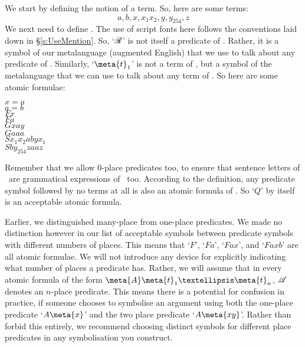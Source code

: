 We start by defining the notion of a term.
So, here are some terms:
	$$a, b, x, x_{1} x_{2}, y, y_{254}, z$$
We next need to define .
The use of script fonts here follows the conventions laid down in §\ref{s:UseMention}. So, `$\mathscr{R}$' is not itself a predicate of \FOL. Rather, it is a symbol of our metalanguage (augmented English) that we use to talk about any predicate of \FOL. Similarly, `$\meta{t}_{1}$' is not a term of \FOL, but a symbol of the metalanguage that we can use to talk about any term of \FOL. So here are some atomic formulae:
	\begin{center}
		$x = a$\\
		$a = b$\\
		$Fx$\\
		$Fa$\\
		$Gxay$\\
		$Gaaa$\\
		$Sx_{1} x_{2} a b y x_{1}$\\
		$Sby_{254} z a a z$\\
	\end{center}
Remember that we allow $0$-place predicates too, to ensure that sentence letters of \TFL\ are grammatical expressions of \FOL\ too. According to the definition, any predicate symbol followed by no terms at all is also an atomic formula of \FOL. So `$Q$' by itself is an acceptable atomic formula.

Earlier, we distinguished many-place from one-place predicates. We made no distinction however in our list of acceptable symbols between predicate symbols with different numbers of places. This means that `$F$', `$Fa$', `$Fax$', and `$Faxb$' are all atomic formulae. We will not introduce any device for explicitly indicating what number of places a predicate has. Rather, we will assume that in every atomic formula of the form $\meta{A}\meta{t}_{1}…\meta{t}_{n}$, $\mathscr{A}$ denotes an $n$-place predicate. This means there is a potential for confusion in practice, if someone chooses to symbolise an argument using both the one-place predicate `$A\meta{x}$' and the two place predicate `$A\meta{xy}$'. Rather than forbid this entirely, we recommend choosing distinct symbols for different place predicates in any symbolisation you construct.

